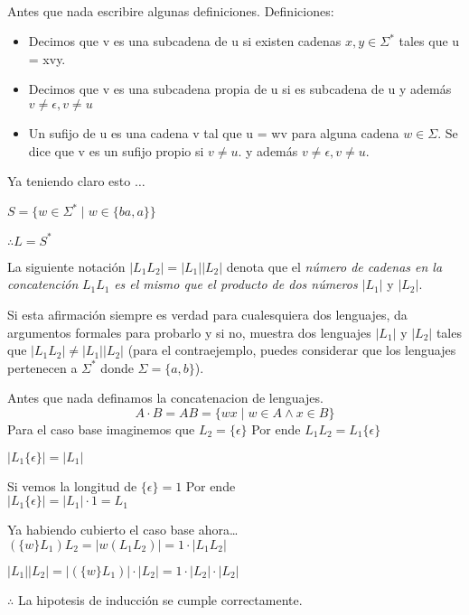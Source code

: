 \begin{questions}
\begin{solution}
    \\
    Antes que nada escribire algunas definiciones.
    Definiciones: \\
    \begin{itemize}
        \item Decimos que v es una subcadena de u si existen cadenas $x,y \in \Sigma^{*}$ tales que u = xvy.
        \item Decimos que v es una subcadena propia de u si es subcadena de u y además $v \neq \epsilon, v \neq u$
        \item Un sufijo de u es una cadena v tal que u = wv para alguna cadena $w \in \Sigma$.
        Se dice que v es un sufijo propio si $v \neq u$.
        y además $v \neq \epsilon, v \neq u$.
    \end{itemize}

    Ya teniendo claro esto $\dots$

    $S = \{ w \in \Sigma^{*} \mid w \in \{ ba,a\}\}$

    $\therefore L = S^{*}$
\end{solution}

\question La siguiente notaci\'on $|L_{1}L_{2}| = |L_{1}||L_{2}|$ denota que el {\it número de cadenas en la concatención}
$L_{1}L_{1}$ {\it es el mismo que el producto de dos n\'umeros $|L_{1}|$} y $|L_{2}|$.

Si esta afirmaci\'on siempre es verdad para cualesquiera dos lenguajes, da argumentos
formales para probarlo y si no, muestra dos lenguajes $|L_{1}|$ y $|L_{2}|$ tales que $|L_{1}L_{2}| \neq |L_{1}||L_{2}|$ (para el
contraejemplo, puedes considerar que los lenguajes pertenecen a $\Sigma^{*}$ donde $\Sigma = \{a,b\}$).

\begin{solution}
    Antes que nada definamos la concatenacion de lenguajes.
    \begin{equation}
        A \cdot B = AB = \{ wx \mid w \in A \wedge x \in B\}
    \end{equation}
    Para el caso base imaginemos que $L_{2} = \{\epsilon\}$ Por ende $L_{1}L_{2} = L_{1}\{\epsilon\}$

    $|L_{1}\{\epsilon\}| = |L_{1}|$ 

    Si vemos la longitud de $\{\epsilon\} = 1$ Por ende \\
    $|L_{1}\{\epsilon\}| = |L_{1}| \cdot 1 = L_{1}$

    Ya habiendo cubierto el caso base ahora\dots \\

    $(\{w\}L_{1})L_{2} = |{w}(L_{1}L_{2})| = 1 \cdot |L_{1}L_{2}|$

    $|L_{1}||L_{2}| = |(\{w\}L_{1})| \cdot |L_{2}| = 1 \cdot |L_{2}| \cdot |L_{2}|$

    $\therefore$ La hipotesis de inducci\'on se cumple correctamente.
    
\end{solution}
\end{questions}



